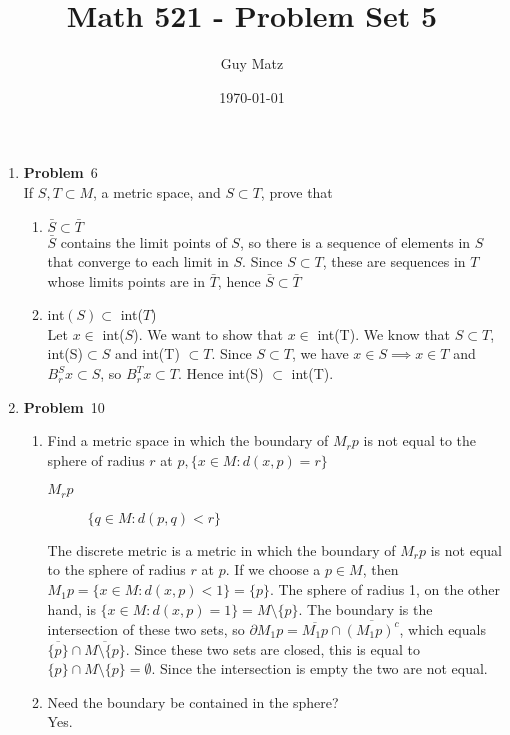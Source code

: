 \documentclass[12pt]{amsart}
\title{\textbf{Math 521 - Problem Set 5}}
\author{Guy Matz}
\date{\today}
\newcommand{\benu}{\begin{enumerate}}
\newcommand{\eenu}{\end{enumerate}}
\theoremstyle{definition}
\newcommand{\itep}{\item {\bfseries Problem}\ }
\begin{document}
 

\maketitle
\newpage %

\begin{enumerate}[series=p]
\itep 6\\
If $S, T \subset M$, a metric space, and $S \subset T$, prove that
	\benu
	\item $\bar{S} \subset \bar{T}$\\
	$\bar{S}$ contains the limit points of $S$, so there is a sequence of elements in $S$ that converge to each limit in $S$.  Since $S \subset T$, these are sequences in $T$ whose limits points are in $\bar{T}$, hence $\bar{S} \subset \bar{T}$
	\item int$(S) \subset$ int($T$) \\
	Let $x \in $ int($S$).  We want to show that $x \in $ int(T).  We know that $S \subset T$, int(S)$ \subset S$ and  int(T) $\subset T$.  Since $S \subset T$, we have $x \in S \implies x \in T$ and $B_r^Sx \subset S$, so $B_r^Tx \subset T$.  Hence int(S) $\subset$ int(T).
	\eenu
\newpage

\itep 10\\
\benu
	\item Find a metric space in which the boundary of $M_rp$ is not equal to the sphere of radius $r$ at $p, \{x \in M : d(x,p) = r\}$\\
	\begin{description}
		\item[$M_rp$] $\{q \in M: d(p,q) < r\}$
	\end{description}
	The discrete metric is a metric in which the boundary of $M_rp$ is not equal to the sphere of radius $r$ at $p$.  If we choose a $p \in M$, then $M_1p = \{x \in M: d(x,p)<1\} = \{p\}$.  The sphere of radius 1, on the other hand, is $\{x \in M : d(x,p)=1 \} = M \setminus \{ p \}$.  The boundary is the intersection of these two sets, so $\partial M_1p = \overline{M_1p} \cap \overline{(M_1p)^c}$, which equals $\overline{\{p\}} \cap \overline{M \setminus \{p\}}$.  Since these two sets are closed, this is equal to $\{p\} \cap M \setminus \{p\} = \emptyset$.  Since the intersection is empty the two are not equal.
	\\
	\item Need the boundary be contained in the sphere?\\
	Yes.  
	
\eenu


\end{enumerate}
\end{document}
